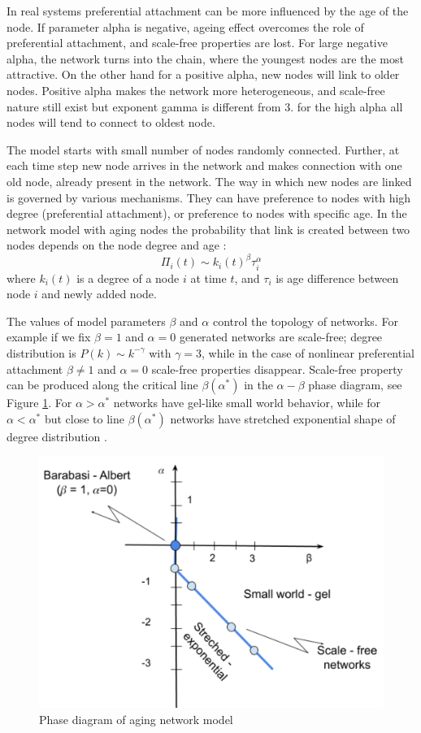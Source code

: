 In real systems preferential attachment can be more influenced by the age of the node. If parameter alpha is negative, ageing effect overcomes the role of preferential attachment, and scale-free properties are lost. For large negative alpha, the network turns into the chain, where the youngest nodes are the most attractive. On the other hand for a positive alpha, new nodes will link to older nodes. Positive alpha makes the network more heterogeneous, and scale-free nature still exist but exponent gamma is different from 3.  for the high alpha all nodes will tend to connect to oldest node. 

The model starts with small number of nodes randomly connected. Further, at each time step new node arrives in the network and makes connection with one old node, already present in the network.
The way in which new nodes are linked is governed by various mechanisms. They can have preference to nodes with high degree (preferential attachment), or preference to nodes with specific age. In the network model with aging nodes the probability that link is created between two nodes depends on the node degree and age \cite{hajra2004}:
\begin{equation}
\Pi_{i}(t)\sim k_{i}(t)^{\beta}\tau_{i}^{\alpha} 
\label{eq:1}
\end{equation}
where $k_{i}(t)$ is a degree of a node $i$ at time $t$, and $\tau_{i}$ is age difference between node $i$ and newly added node. 

The values of model parameters $\beta$ and $\alpha$ control the topology of networks.  For example if we fix $\beta=1$ and $\alpha=0$ generated networks are scale-free; degree distribution is $P(k) \sim k^{-\gamma}$ with $\gamma=3$, while in the case of nonlinear preferential attachment $\beta \neq 1$ and $\alpha=0$ scale-free properties disappear. Scale-free property can be produced along the critical line $\beta(\alpha^{*})$ in the $\alpha-\beta$ phase diagram, see Figure \ref{fig:diagram}. For $\alpha>\alpha^{*}$ networks have gel-like small world behavior, while for $\alpha<\alpha^{*}$ but close to line $\beta(\alpha^{*})$ networks have stretched exponential shape of degree distribution \cite{hajra2004}.  

\begin{figure}[!ht]
	\centering
	\includegraphics[width=0.5\linewidth]{Figures/diagram.png}
	\caption{Phase diagram of aging network model}
	\label{fig:diagram}
\end{figure}


